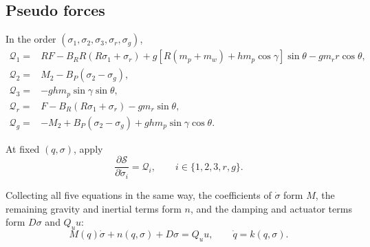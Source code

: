 \subsection*{Pseudo forces}
In the order $(\sigma_1,\sigma_2,\sigma_3,\sigma_r,\sigma_g)$,
\begin{equation}
\boxed{\begin{aligned}
\mathcal Q_1={}&RF-B_RR(R\sigma_1+\sigma_r)
+g[R(m_p+m_w)+hm_p\cos\gamma]\sin\theta-gm_rr\cos\theta,\\
\mathcal Q_2={}&M_2-B_P(\sigma_2-\sigma_g),\\
\mathcal Q_3={}&-ghm_p\sin\gamma\sin\theta,\\
\mathcal Q_r={}&F-B_R(R\sigma_1+\sigma_r)-gm_r\sin\theta,\\
\mathcal Q_g={}&-M_2+B_P(\sigma_2-\sigma_g)+ghm_p\sin\gamma\cos\theta.
\end{aligned}}
\end{equation}

At fixed $(q,\sigma)$, apply
\begin{equation}
\frac{\partial\mathcal S}{\partial\dot\sigma_i}=\mathcal Q_i,
\qquad i\in\{1,2,3,r,g\}.
\end{equation}

Collecting all five equations in the same way, the coefficients of
$\dot\sigma$ form $M$, the remaining gravity and inertial terms form $n$,
and the damping and actuator terms form $D\sigma$ and $Q_u u$:
\begin{equation}
\boxed{M(q)\dot\sigma+n(q,\sigma)+D\sigma=Q_u u,
\qquad \dot q=k(q,\sigma).}
\end{equation}
